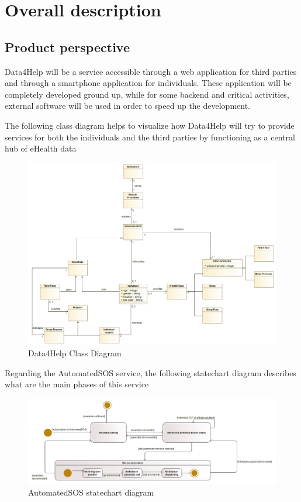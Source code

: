 \chapter{Overall description}
\section{Product perspective}
Data4Help will be a service accessible through a web application for third parties and through a smartphone application for individuals. These application will be completely developed ground up, while for some backend and critical activities, external software will be used in order to speed up the development.


The following class diagram helps to visualize how Data4Help will try to provide services for both the individuals and the third parties by functioning as a central hub of eHealth data

\begin{figure}[H]
  \includegraphics[width=0.89\linewidth]{resources/UML/Data4HelpClassDiagram.png}
  \caption{Data4Help Class Diagram}
  \label{fig: Data4Help Class diagram}
\end{figure}

Regarding the AutomatedSOS service, the following statechart diagram describes what are the main phases of this service

\begin{figure}[H]
  \includegraphics[width=0.89\linewidth]{resources/UML/AutomatedSOSstatechart.png}
  \caption{AutomatedSOS statechart diagram}
  \label{fig: AutoamtedSOS statechart diagram}
\end{figure}


